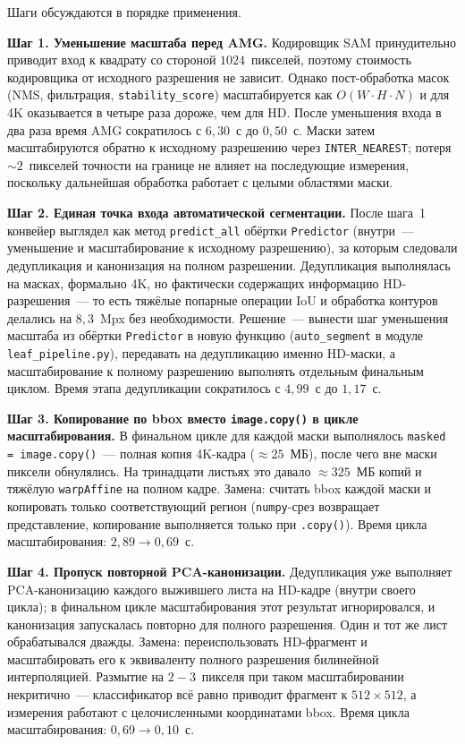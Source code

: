 Шаги обсуждаются в порядке применения.

\textbf{Шаг 1. Уменьшение масштаба перед AMG.} Кодировщик SAM принудительно
приводит вход к квадрату со стороной $1024$~пикселей, поэтому стоимость
кодировщика от исходного разрешения не зависит. Однако пост-обработка масок
(NMS, фильтрация, \texttt{stability\_score}) масштабируется как $O(W \cdot H \cdot N)$
и для 4K оказывается в четыре раза дороже, чем для HD. После уменьшения входа
в два раза время AMG сократилось с $6{,}30$~с до $0{,}50$~с. Маски затем
масштабируются обратно к исходному разрешению через \texttt{INTER\_NEAREST};
потеря $\sim 2$~пикселей точности на границе не влияет на последующие измерения,
поскольку дальнейшая обработка работает с целыми областями маски.

\textbf{Шаг 2. Единая точка входа автоматической сегментации.} После шага~1
конвейер выглядел как метод \texttt{predict\_all} обёртки \texttt{Predictor}
(внутри~--- уменьшение и масштабирование к исходному разрешению), за которым
следовали дедупликация и канонизация на полном разрешении. Дедупликация
выполнялась на масках, формально 4K, но фактически содержащих информацию
HD-разрешения~--- то есть тяжёлые попарные операции IoU и обработка контуров
делались на $8{,}3$~Mpx без необходимости. Решение~--- вынести шаг уменьшения
масштаба из обёртки \texttt{Predictor} в новую функцию (\texttt{auto\_segment}
в модуле \texttt{leaf\_pipeline.py}), передавать на дедупликацию именно
HD-маски, а масштабирование к полному разрешению выполнять отдельным финальным
циклом. Время этапа дедупликации сократилось с $4{,}99$~с до $1{,}17$~с.

\textbf{Шаг 3. Копирование по bbox вместо \texttt{image.copy()} в цикле
масштабирования.} В финальном цикле для каждой маски выполнялось
\texttt{masked = image.copy()}~--- полная копия 4K-кадра ($\approx 25$~МБ),
после чего вне маски пиксели обнулялись. На тринадцати листьях это давало
$\approx 325$~МБ копий и тяжёлую \texttt{warpAffine} на полном кадре. Замена:
считать bbox каждой маски и копировать только соответствующий регион
(\texttt{numpy}-срез возвращает представление, копирование выполняется только
при \texttt{.copy()}). Время цикла масштабирования: $2{,}89 \to 0{,}69$~с.

\textbf{Шаг 4. Пропуск повторной PCA-канонизации.} Дедупликация уже выполняет
PCA-канонизацию каждого выжившего листа на HD-кадре (внутри своего цикла);
в финальном цикле масштабирования этот результат игнорировался, и канонизация
запускалась повторно для полного разрешения. Один и тот же лист
обрабатывался дважды. Замена: переиспользовать HD-фрагмент и масштабировать
его к эквиваленту полного разрешения билинейной интерполяцией. Размытие на
$2\!-\!3$~пикселя при таком масштабировании некритично~--- классификатор всё
равно приводит фрагмент к $512 \times 512$, а измерения работают с
целочисленными координатами bbox. Время цикла масштабирования:
$0{,}69 \to 0{,}10$~с.

